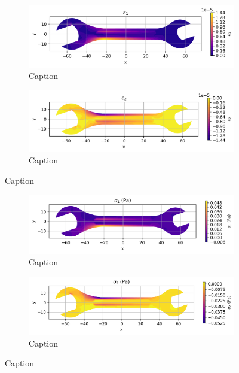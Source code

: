 \begin{figure}[H]
  \centering
  \begin{subfigure}[t]{0.49\textwidth}
    \centering
    \includegraphics[width=\textwidth]{GRAFICOS/Case d - epsilon_1.png}
    \caption{Caption}
    \label{fig:deformada_reacciones}
  \end{subfigure}
  \hfill
  \begin{subfigure}[t]{0.49\textwidth}
    \centering
    \includegraphics[width=\textwidth]{GRAFICOS/Case d - epsilon_2.png}
    \caption{Caption}
    \label{fig:von_mises}
  \end{subfigure}
  \caption{Caption}
  \label{fig:analisis_estructural}
\end{figure}

\begin{figure}[H]
  \centering
  \begin{subfigure}[t]{0.49\textwidth}
    \centering
    \includegraphics[width=\textwidth]{GRAFICOS/Case d - sigma_1.png}
    \caption{Caption}
    \label{fig:deformada_reacciones}
  \end{subfigure}
  \hfill
  \begin{subfigure}[t]{0.49\textwidth}
    \centering
    \includegraphics[width=\textwidth]{GRAFICOS/Case d - sigma_2.png}
    \caption{Caption}
    \label{fig:von_mises}
  \end{subfigure}
  \caption{Caption}
  \label{fig:analisis_estructural}
\end{figure}


